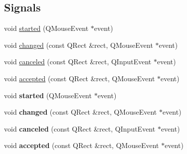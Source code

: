 \subsection*{Signals}
\begin{DoxyCompactItemize}
\item 
void \hyperlink{class_q_c_p_selection_rect_a7b7162d19f4f2174d3644ff1a5d335aa}{started} (Q\+Mouse\+Event $\ast$event)
\item 
void \hyperlink{class_q_c_p_selection_rect_a1bab11026bca52740c2e6682623e6964}{changed} (const Q\+Rect \&rect, Q\+Mouse\+Event $\ast$event)
\item 
void \hyperlink{class_q_c_p_selection_rect_aeb82009393c90130102dccf36477b906}{canceled} (const Q\+Rect \&rect, Q\+Input\+Event $\ast$event)
\item 
void \hyperlink{class_q_c_p_selection_rect_a15a43542e1f7b953a44c260b419e6d2c}{accepted} (const Q\+Rect \&rect, Q\+Mouse\+Event $\ast$event)
\item 
void {\bfseries started} (Q\+Mouse\+Event $\ast$event)\hypertarget{class_q_c_p_selection_rect_a7b7162d19f4f2174d3644ff1a5d335aa}{}\label{class_q_c_p_selection_rect_a7b7162d19f4f2174d3644ff1a5d335aa}

\item 
void {\bfseries changed} (const Q\+Rect \&rect, Q\+Mouse\+Event $\ast$event)\hypertarget{class_q_c_p_selection_rect_a1bab11026bca52740c2e6682623e6964}{}\label{class_q_c_p_selection_rect_a1bab11026bca52740c2e6682623e6964}

\item 
void {\bfseries canceled} (const Q\+Rect \&rect, Q\+Input\+Event $\ast$event)\hypertarget{class_q_c_p_selection_rect_aeb82009393c90130102dccf36477b906}{}\label{class_q_c_p_selection_rect_aeb82009393c90130102dccf36477b906}

\item 
void {\bfseries accepted} (const Q\+Rect \&rect, Q\+Mouse\+Event $\ast$event)\hypertarget{class_q_c_p_selection_rect_a15a43542e1f7b953a44c260b419e6d2c}{}\label{class_q_c_p_selection_rect_a15a43542e1f7b953a44c260b419e6d2c}

\end{DoxyCompactItemize}
